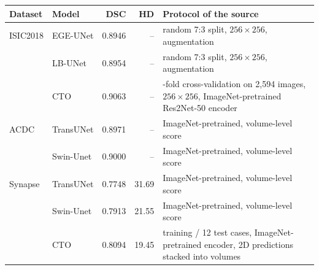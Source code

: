 \begin{tabular}{@{}llrr>{\raggedright\arraybackslash}p{5.6cm}@{}}
\toprule
Dataset & Model & DSC & HD\tnote{a} & Protocol of the source \\
\midrule
ISIC2018 & EGE-UNet \citep{Ruan2023EGEUNet} & 0.8946 & -- & random 7:3 split, $256\times256$, augmentation \\
 & LB-UNet \citep{Xu2024LBUNet} & 0.8954 & -- & random 7:3 split, $256\times256$, augmentation \\
 & CTO \citep{Lin2025Rethinking} & 0.9063 & -- & 5-fold cross-validation on 2,594 images, $256\times256$, ImageNet-pretrained Res2Net-50 encoder \\
ACDC & TransUNet \citep{Chen2021TransUNetArxiv} & 0.8971 & -- & ImageNet-pretrained, volume-level score \\
 & Swin-Unet \citep{Cao2022SwinUnet} & 0.9000 & -- & ImageNet-pretrained, volume-level score \\
Synapse & TransUNet \citep{Chen2021TransUNetArxiv} & 0.7748 & 31.69 & ImageNet-pretrained, volume-level score \\
 & Swin-Unet \citep{Cao2022SwinUnet} & 0.7913 & 21.55 & ImageNet-pretrained, volume-level score \\
 & CTO \citep{Lin2025Rethinking} & 0.8094 & 19.45 & 18 training / 12 test cases, ImageNet-pretrained encoder, 2D predictions stacked into volumes \\
\bottomrule
\end{tabular}
